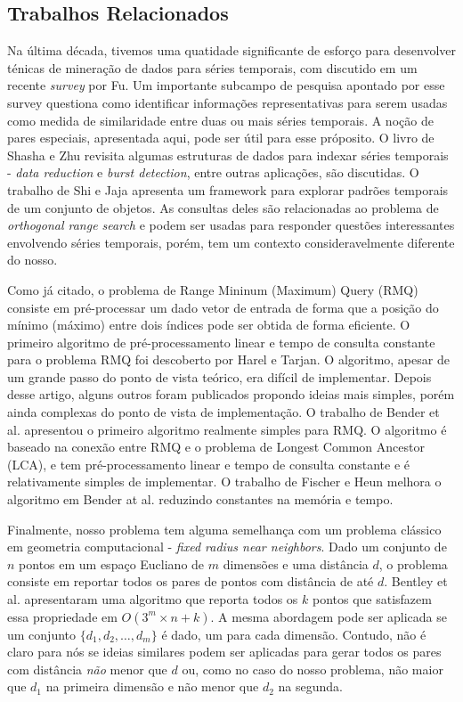 \documentclass[12pt]{article}
\begin{document}
\subsection{Trabalhos Relacionados}

Na última década, tivemos uma quatidade significante de esforço 
para desenvolver ténicas de mineração de dados para séries
temporais, com discutido em um recente \textit{survey} por Fu\cite{lala}.
Um importante subcampo de pesquisa apontado por esse survey questiona
como identificar informações representativas para serem usadas como medida
de similaridade entre duas ou mais séries temporais. A noção de pares
especiais, apresentada aqui, pode ser útil para esse próposito. O livro
de Shasha e Zhu \cite{lala} revisita algumas estruturas de dados para indexar
séries temporais - \textit{data reduction} e \textit{burst detection}, entre outras
aplicações, são discutidas. O trabalho de Shi e Jaja\cite{lala} apresenta um framework
para explorar padrões temporais de um conjunto de objetos. As consultas deles são relacionadas
ao problema de \textit{orthogonal range search} e podem ser usadas para responder questões
interessantes envolvendo séries temporais, porém, tem um contexto consideravelmente diferente
do nosso.
        
Como já citado, o problema de Range Mininum (Maximum) Query (RMQ) consiste em pré-processar um dado
vetor de entrada de forma que a posição do mínimo (máximo) entre dois índices pode
ser obtida de forma eficiente. O primeiro algoritmo de pré-processamento linear e tempo
de consulta constante para o problema RMQ foi descoberto por Harel e Tarjan\cite{lala}. 
O algoritmo, apesar de um grande passo do ponto de vista teórico, era difícil de implementar.
Depois desse artigo, alguns outros foram publicados propondo ideias mais simples, porém ainda
complexas do ponto de vista de implementação. O trabalho de Bender et al. \cite{lala} apresentou
o primeiro algoritmo realmente simples para RMQ. O algoritmo é baseado na conexão entre RMQ e
o problema de  Longest Common Ancestor (LCA), e tem pré-processamento linear e tempo de consulta
constante e é relativamente simples de implementar. O trabalho de Fischer e Heun\cite{} melhora
o algoritmo em Bender at al. reduzindo constantes na memória e tempo.

Finalmente, nosso problema tem alguma semelhança com um problema clássico em geometria computacional -
\textit{fixed radius near neighbors}. Dado um conjunto de $n$ pontos em um espaço Eucliano de $m$ dimensões
e uma distância $d$, o problema consiste em reportar todos os pares de pontos com distância de até $d$.
Bentley et al.\cite{lala} apresentaram uma algoritmo que reporta todos os $k$ pontos que satisfazem
essa propriedade em $O(3^m\times n + k)$. A mesma abordagem pode ser aplicada se um conjunto $\{d_1, d_2, \ldots, d_m\}$ é dado, um para cada dimensão. Contudo, não é claro para nós se ideias similares podem ser aplicadas
para gerar todos os pares com distância \textit{não} menor que $d$ ou, como no caso do nosso problema, não 
maior que $d_1$ na primeira dimensão e não menor que $d_2$ na segunda.
\end{document}
